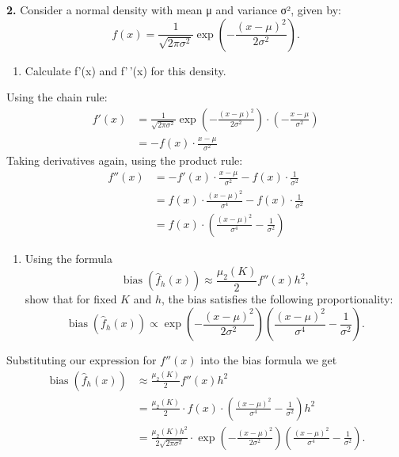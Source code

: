 \documentclass[
  a4paper,
]{article}
\providecommand{\tightlist}{%
  \setlength{\itemsep}{0pt}\setlength{\parskip}{0pt}}
\theoremstyle{definition}
\theoremstyle{definition}
\theoremstyle{definition}
\theoremstyle{definition}
\theoremstyle{remark}
\begin{document}
\textbf{2.} Consider a normal density with mean μ and variance σ², given by:
\begin{equation*}
f(x) = \frac{1}{\sqrt{2\pi\sigma^2}} \exp\left(-\frac{(x-\mu)^2}{2\sigma^2}\right).
\end{equation*}

\begin{enumerate}
\def\labelenumi{\alph{enumi}.}
\tightlist
\item
  Calculate f'(x) and f'\,'(x) for this density.
\end{enumerate}

\begin{myanswers}
Using the chain rule:
\begin{align*}
  f'(x)
  &= \frac{1}{\sqrt{2\pi\sigma^2}} \exp\left(-\frac{(x-\mu)^2}{2\sigma^2}\right) \cdot \left(-\frac{x-\mu}{\sigma^2}\right) \\
  &= -f(x)\cdot\frac{x-\mu}{\sigma^2}
\end{align*}
Taking derivatives again, using the product rule:
\begin{align*}
  f''(x)
  &= -f'(x)\cdot\frac{x-\mu}{\sigma^2} - f(x)\cdot\frac{1}{\sigma^2} \\
  &= f(x)\cdot\frac{(x-\mu)^2}{\sigma^4} - f(x)\cdot\frac{1}{\sigma^2} \\
  &= f(x)\cdot\left(\frac{(x-\mu)^2}{\sigma^4} - \frac{1}{\sigma^2}\right)
\end{align*}

\end{myanswers}

\begin{enumerate}
\def\labelenumi{\alph{enumi}.}
\setcounter{enumi}{1}
\tightlist
\item
  Using the formula
  \begin{equation*}
    \mathop{\mathrm{bias}}(\hat f_h(x))
    \approx \frac{\mu_2(K)}{2} f''(x) h^2,
  \end{equation*}
  show that for fixed \(K\) and \(h\), the bias satisfies the following proportionality:
  \begin{equation*}
    \mathop{\mathrm{bias}}(\hat f_h(x))
    \propto \exp\left(-\frac{(x-\mu)^2}{2\sigma^2}\right)
   \left(\frac{(x-\mu)^2}{\sigma^4} - \frac{1}{\sigma^2}\right).
  \end{equation*}
\end{enumerate}

\begin{myanswers}
Substituting our expression for \(f''(x)\) into the bias formula we get
\begin{align*}
  \mathop{\mathrm{bias}}(\hat f_h(x))
  &\approx \frac{\mu_2(K)}{2} f''(x) h^2 \\
  &= \frac{\mu_2(K)}{2} \cdot f(x)\cdot\left(\frac{(x-\mu)^2}{\sigma^4} - \frac{1}{\sigma^2}\right) h^2 \\
  &=
  \frac{\mu_2(K)h^2}{2\sqrt{2\pi\sigma^2}} \cdot
  \exp\left(-\frac{(x-\mu)^2}{2\sigma^2}\right)
  \left(\frac{(x-\mu)^2}{\sigma^4} - \frac{1}{\sigma^2}\right).
\end{align*}

\end{myanswers}
\end{document}
